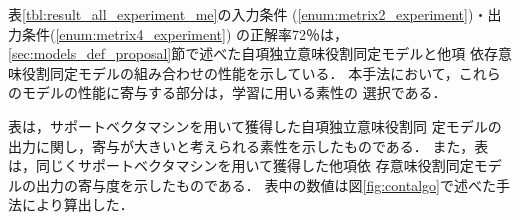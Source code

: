 \documentclass[japanese]{jnlp_1.2b}
\begin{document}
表\ref{tbl:result_all_experiment_me}の入力条件
(\ref{enum:metrix2_experiment})・出力条件(\ref{enum:metrix4_experiment})
の正解率72％は，
\ref{sec:models_def_proposal}節で述べた自項独立意味役割同定モデルと他項
依存意味役割同定モデルの組み合わせの性能を示している．
本手法において，これらのモデルの性能に寄与する部分は，学習に用いる素性の
選択である．

\addtocounter{table}{1}
\setcounter{tablea}{\thetable}
\addtocounter{table}{1}
\setcounter{tableb}{\thetable}


表{\thetablea}は，サポートベクタマシンを用いて獲得した自項独立意味役割同
定モデルの出力に関し，寄与が大きいと考えられる素性を示したものである．
また，表{\thetableb}は，同じくサポートベクタマシンを用いて獲得した他項依
存意味役割同定モデルの出力の寄与度を示したものである．
表中の数値は図\ref{fig:contalgo}で述べた手法により算出した．
\end{document}
